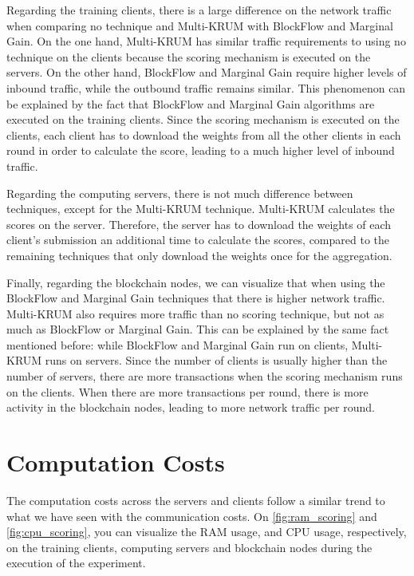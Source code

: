 Regarding the training clients, there is a large difference on the network traffic when comparing no technique and Multi-KRUM with BlockFlow and Marginal Gain. On the one hand, Multi-KRUM has similar traffic requirements to using no technique on the clients because the scoring mechanism is executed on the servers. On the other hand, BlockFlow and Marginal Gain require higher levels of inbound traffic, while the outbound traffic remains similar. This phenomenon can be explained by the fact that BlockFlow and Marginal Gain algorithms are executed on the training clients. Since the scoring mechanism is executed on the clients, each client has to download the weights from all the other clients in each round in order to calculate the score, leading to a much higher level of inbound traffic.

Regarding the computing servers, there is not much difference between techniques, except for the Multi-KRUM technique. Multi-KRUM calculates the scores on the server. Therefore, the server has to download the weights of each client's submission an additional time to calculate the scores, compared to the remaining techniques that only download the weights once for the aggregation.

Finally, regarding the blockchain nodes, we can visualize that when using the BlockFlow and Marginal Gain techniques that there is higher network traffic. Multi-KRUM also requires more traffic than no scoring technique, but not as much as BlockFlow or Marginal Gain. This can be explained by the same fact mentioned before: while BlockFlow and Marginal Gain run on clients, Multi-KRUM runs on servers. Since the number of clients is usually higher than the number of servers, there are more transactions when the scoring mechanism runs on the clients. When there are more transactions per round, there is more activity in the blockchain nodes, leading to more network traffic per round.

\section{Computation Costs}

The computation costs across the servers and clients follow a similar trend to what we have seen with the communication costs. On \autoref{fig:ram_scoring} and \autoref{fig:cpu_scoring}, you can visualize the RAM usage, and CPU usage, respectively, on the training clients, computing servers and blockchain nodes during the execution of the experiment.

